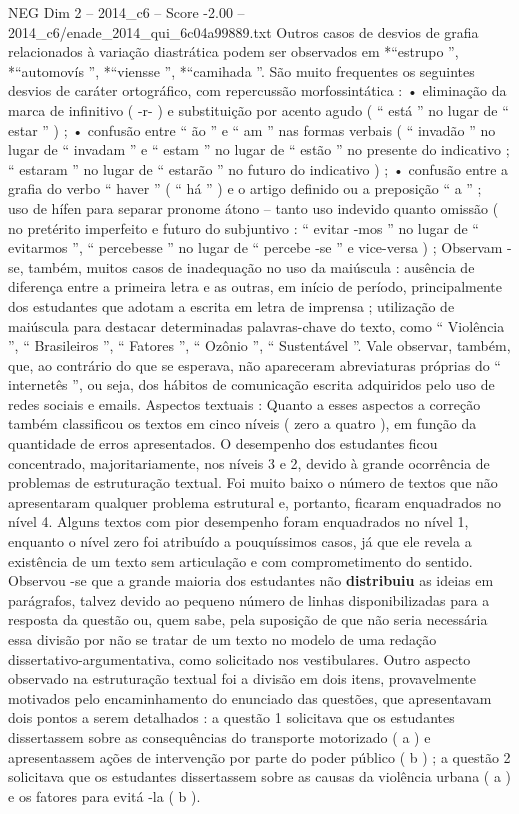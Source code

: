 \begin{textsample}{NEG Dim 2 – 2014\_c6 – Score -2.00 – 2014\_c6/enade\_2014\_qui\_6c04a99889.txt}
Outros casos de desvios de grafia relacionados à variação diastrática podem ser observados em *“estrupo ”, *“automovís ”, *“viensse ”, *“camihada ”.
São muito frequentes os seguintes desvios de caráter ortográfico, com repercussão morfossintática : • eliminação da marca de infinitivo ( -r- ) e substituição por acento agudo ( “ está ” no lugar de “ estar ” ) ; • confusão entre “ ão ” e “ am ” nas formas verbais ( “ invadão ” no lugar de “ invadam ” e “ estam ” no lugar de “ estão ” no presente do indicativo ; “ estaram ” no lugar de “ estarão ” no futuro do indicativo ) ; • confusão entre a grafia do verbo “ haver ” ( “ há ” ) e o artigo definido ou a preposição “ a ” ;  uso de hífen para separar pronome átono – tanto uso indevido quanto omissão ( no pretérito imperfeito e futuro do subjuntivo : “ evitar -mos ” no lugar de “ evitarmos ”, “ percebesse ” no lugar de “ percebe -se ” e vice-versa ) ; Observam -se, também, muitos casos de inadequação no uso da maiúscula : ausência de diferença entre a primeira letra e as outras, em início de período, principalmente dos estudantes que adotam a escrita em letra de imprensa ; utilização de maiúscula para destacar determinadas palavras-chave do texto, como “ Violência ”, “ Brasileiros ”, “ Fatores ”, “ Ozônio ”, “ Sustentável ”.
Vale observar, também, que, ao contrário do que se esperava, não apareceram abreviaturas próprias do “ internetês ”, ou seja, dos hábitos de comunicação escrita adquiridos pelo uso de redes sociais e emails.
Aspectos textuais : Quanto a esses aspectos a correção também classificou os textos em cinco níveis ( zero a quatro ), em função da quantidade de erros apresentados.
O desempenho dos estudantes ficou concentrado, majoritariamente, nos níveis 3 e 2, devido à grande ocorrência de problemas de estruturação textual.
Foi muito baixo o número de textos que não apresentaram qualquer problema estrutural e, portanto, ficaram enquadrados no nível 4.
Alguns textos com pior desempenho foram enquadrados no nível 1, enquanto o nível zero foi atribuído a pouquíssimos casos, já que ele revela a existência de um texto sem articulação e com comprometimento do sentido.
Observou -se que a grande maioria dos estudantes não \textbf{distribuiu} as ideias em parágrafos, talvez devido ao pequeno número de linhas disponibilizadas para a resposta da questão ou, quem sabe, pela suposição de que não seria necessária essa divisão por não se tratar de um texto no modelo de uma redação dissertativo-argumentativa, como solicitado nos vestibulares.
Outro aspecto observado na estruturação textual foi a divisão em dois itens, provavelmente motivados pelo encaminhamento do enunciado das questões, que apresentavam dois pontos a serem detalhados : a questão 1 solicitava que os estudantes dissertassem sobre as consequências do transporte motorizado ( a ) e apresentassem ações de intervenção por parte do poder público ( b ) ; a questão 2 solicitava que os estudantes dissertassem sobre as causas da violência urbana ( a ) e os fatores para evitá -la ( b ).

\end{textsample}
